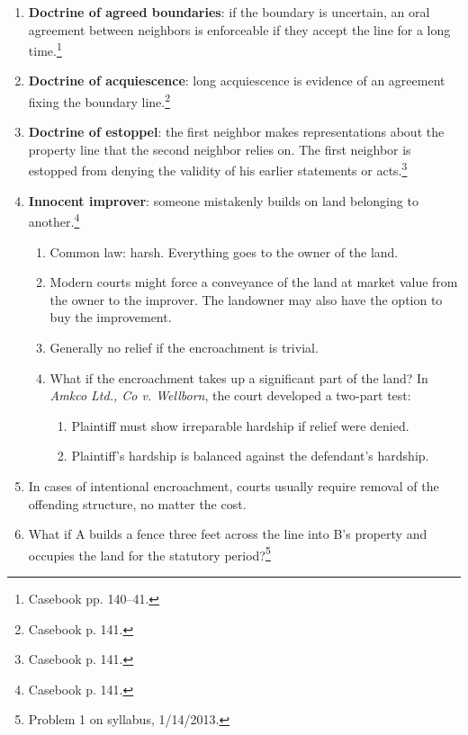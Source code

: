 \begin{enumerate}
    \item \textbf{Doctrine of agreed boundaries}: if the boundary is 
    uncertain, an oral agreement between neighbors is enforceable if they 
    accept the line for a long time.\footnote{Casebook pp. 140--41.}
    \item \textbf{Doctrine of acquiescence}: long acquiescence is evidence of 
    an agreement fixing the boundary line.\footnote{Casebook p. 141.}
    \item \textbf{Doctrine of estoppel}: the first neighbor makes 
    representations about the property line that the second neighbor relies 
    on. The first neighbor is estopped from denying the validity of his 
    earlier statements or acts.\footnote{Casebook p. 141.}
    \item \textbf{Innocent improver}: someone mistakenly builds on land 
    belonging to another.\footnote{Casebook p. 141.}
    \begin{enumerate}
        \item Common law: harsh. Everything goes to the owner of the land.
        \item Modern courts might force a conveyance of the land at market 
        value from the owner to the improver. The landowner may also have the 
        option to buy the improvement.
        \item Generally no relief if the encroachment is trivial.
        \item What if the encroachment takes up a significant part of the 
        land? In \emph{Amkco Ltd., Co v. Wellborn}, the court developed a 
        two-part test:
        \begin{enumerate}
            \item Plaintiff must show irreparable hardship if relief were 
            denied.
            \item Plaintiff's hardship is balanced against the defendant's 
            hardship.
        \end{enumerate}
    \end{enumerate}
    \item In cases of intentional encroachment, courts usually require removal 
    of the offending structure, no matter the cost.
    \item What if A builds a fence three feet across the line into B's 
    property and occupies the land for the statutory period?\footnote{Problem 
    1 on syllabus, 1/14/2013.}
    \begin{enumerate}

\end{enumerate}
\end{enumerate}
